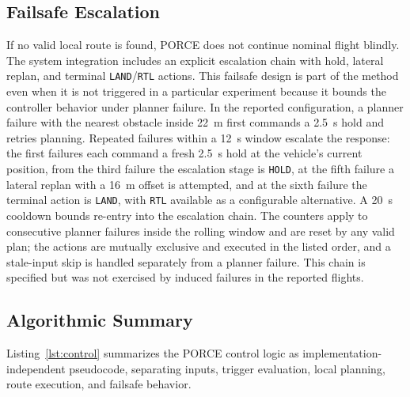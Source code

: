 \documentclass[electronics,article,submit,moreauthors]{Definitions/mdpi}
\DeclareRobustCommand{\deleted}[1]{}%
\DeclareRobustCommand{\added}[1]{#1}%
\DeclareRobustCommand{\deleted}[1]{\textcolor{black}{\sout{#1}}}
\DeclareRobustCommand{\added}[1]{\textcolor{green!50!black}{#1}}
\def\deleted#1{}%
\def\added#1{#1}%
\begin{document}
\subsection{Failsafe Escalation}

If no valid local route is found, PORCE does not continue nominal flight blindly. The system integration includes an explicit escalation chain with hold, lateral replan, and terminal \texttt{LAND}/\texttt{RTL} actions. This failsafe design is part of the method even when it is not triggered in a particular experiment because it bounds the controller behavior under planner failure. \added{In the reported configuration, a planner failure with the nearest obstacle inside 22~m first commands a 2.5~s hold and retries planning. Repeated failures within a 12~s window escalate the response: the first failures each command a fresh 2.5~s hold at the vehicle's current position, from the third failure the escalation stage is \texttt{HOLD}, at the fifth failure a lateral replan with a 16~m offset is attempted, and at the sixth    failure the terminal action is \texttt{LAND}, with \texttt{RTL} available as a configurable alternative. A 20~s cooldown bounds re-entry into the escalation chain. The counters apply to consecutive planner failures inside the rolling window and are reset by any valid plan; the actions are mutually exclusive and executed in the listed order, and a stale-input skip is handled separately from a planner failure. This chain is specified but was not exercised by induced failures in the reported flights.}



\subsection{Algorithmic Summary}
Listing\deleted{ }\added{~}\ref{lst:control} summarizes the \deleted{complete}\added{PORCE} control \deleted{loop of the proposed method, integrating the nominal navigation, dynamic triggering, bounded replanning}\added{logic as implementation-independent pseudocode, separating inputs, trigger evaluation, local planning, route execution}, and failsafe \deleted{escalation described in Sections 2.1--2.5.}\added{behavior.}
\end{document}
